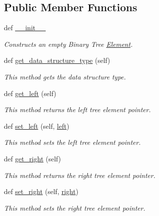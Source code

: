 \subsection*{Public Member Functions}
\begin{DoxyCompactItemize}
\item 
def \hyperlink{class_bridges_1_1_bin_tree_element_1_1_bin_tree_element_a8bd71987fc37ffd587edce7faf3ccec9}{\+\_\+\+\_\+init\+\_\+\+\_\+}
\begin{DoxyCompactList}\small\item\em Constructs an empty Binary Tree \hyperlink{namespace_bridges_1_1_element}{Element}. \end{DoxyCompactList}\item 
def \hyperlink{class_bridges_1_1_bin_tree_element_1_1_bin_tree_element_a141edccea36285810ded005aedd1ae41}{get\+\_\+data\+\_\+structure\+\_\+type} (self)
\begin{DoxyCompactList}\small\item\em This method gets the data structure type. \end{DoxyCompactList}\item 
def \hyperlink{class_bridges_1_1_bin_tree_element_1_1_bin_tree_element_afb02902f3dcf40e561f3d477c088cfbd}{get\+\_\+left} (self)
\begin{DoxyCompactList}\small\item\em This method returns the left tree element pointer. \end{DoxyCompactList}\item 
def \hyperlink{class_bridges_1_1_bin_tree_element_1_1_bin_tree_element_aa3d0afa18e6b058b4b1d8625ca6eca9a}{set\+\_\+left} (self, \hyperlink{class_bridges_1_1_bin_tree_element_1_1_bin_tree_element_af5631062deb9040b39ed0f1c44047997}{left})
\begin{DoxyCompactList}\small\item\em This method sets the left tree element pointer. \end{DoxyCompactList}\item 
def \hyperlink{class_bridges_1_1_bin_tree_element_1_1_bin_tree_element_a3c013517d9600682363a4a8ee88dfc80}{get\+\_\+right} (self)
\begin{DoxyCompactList}\small\item\em This method returns the right tree element pointer. \end{DoxyCompactList}\item 
def \hyperlink{class_bridges_1_1_bin_tree_element_1_1_bin_tree_element_ac93c9e5553a10645c6157a14fe85dda6}{set\+\_\+right} (self, \hyperlink{class_bridges_1_1_bin_tree_element_1_1_bin_tree_element_ae2e489fc41e232af5467eb2e48692f67}{right})
\begin{DoxyCompactList}\small\item\em This method sets the right tree element pointer. \end{DoxyCompactList}\end{DoxyCompactItemize}
